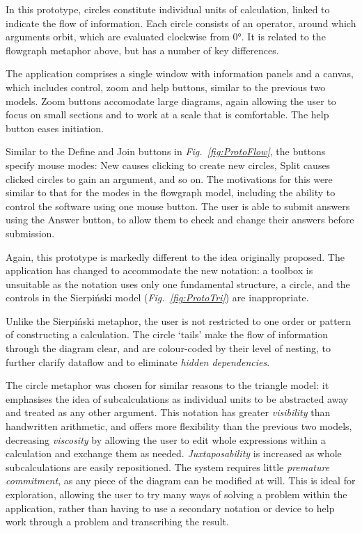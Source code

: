 \documentclass[12pt,twoside,notitlepage,xetex]{report}
\begin{document}
{In this prototype, circles constitute individual units of calculation, linked to indicate the flow of information. Each circle consists of an operator, around which arguments orbit, which are evaluated clockwise from 0°.  It is related to the flowgraph metaphor above, but has a number of key differences.

The application comprises a single window with information panels and a canvas, which includes control, zoom and help buttons, similar to the previous two models.  Zoom buttons accomodate large diagrams, again allowing the user to focus on small sections and to work at a scale that is comfortable.  The help button eases initiation.

Similar to the {\sfapp Define} and {\sfapp Join} buttons in \emph{Fig.~\ref{fig:ProtoFlow}}, the buttons specify mouse modes: {\sfapp New} causes clicking to create new circles, {\sfapp Split} causes clicked circles to gain an argument, and so on. The motivations for this were similar to that for the modes in the flowgraph model, including the ability to control the software using one mouse button.  The user is able to submit answers using the {\sfapp Answer} button, to allow them to check and change their answers before submission.

Again, this prototype is markedly different to the idea originally proposed.  The application has changed to accommodate the new notation: a toolbox is unsuitable as the notation uses only one fundamental structure, a circle, and the controls in the Sierpiński model (\emph{Fig.~\ref{fig:ProtoTri}}) are inappropriate.

Unlike the Sierpiński metaphor, the user is not restricted to one order or pattern of constructing a calculation.  The circle `tails' make the flow of information through the diagram clear, and are colour-coded by their level of nesting, to further clarify dataflow and to eliminate \emph{hidden dependencies}.

The circle metaphor was chosen for similar reasons to the triangle model: it emphasises the idea of subcalculations as individual units to be abstracted away and treated as any other argument.  This notation has greater \emph{visibility} than handwritten arithmetic, and offers more flexibility than the previous two models, decreasing \emph{viscosity} by allowing the user to edit whole expressions within a calculation and exchange them as needed.  \emph{Juxtaposability} is increased as whole subcalculations are easily repositioned.  The system requires little \emph{premature commitment}, as any piece of the diagram can be modified at will.  This is ideal for exploration, allowing the user to try many ways of solving a problem within the application, rather than having to use a secondary notation or device to help work through a problem and transcribing the result.

}
\end{document}
